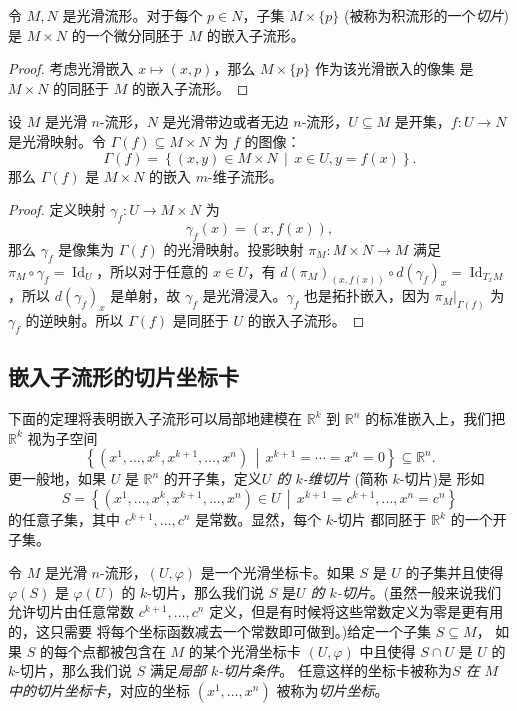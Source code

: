 \documentclass[fontset=none]{Notes}
\DeclareMathOperator\Id{Id}
\begin{document}
\begin{proposition}[积流形的切片]
  令 $M,N$ 是光滑流形。对于每个 $p\in N$，子集 $M\times\{p\}$ (被称为积流形的一个\emph{切片})
  是 $M\times N$ 的一个微分同胚于 $M$ 的嵌入子流形。
\end{proposition}
\begin{proof}
  考虑光滑嵌入 $x\mapsto (x,p)$，那么 $M\times\{p\}$ 作为该光滑嵌入的像集
  是 $M\times N$ 的同胚于 $M$ 的嵌入子流形。
\end{proof}

\begin{proposition}[图像作为子流形]\label{prop:graph is submanifold}
  设 $M$ 是光滑 $n$-流形，$N$ 是光滑带边或者无边 $n$-流形，$U\subseteq M$
  是开集，$f:U\to N$ 是光滑映射。令 $\Gamma(f)\subseteq M\times N$ 为 $f$
  的图像：
  \[
    \Gamma(f)=\left\{(x,y)\in M\times N\,\middle|\, x\in U,y=f(x)\right\}  .
  \]
  那么 $\Gamma(f)$ 是 $M\times N$ 的嵌入 $m$-维子流形。
\end{proposition}
\begin{proof}
  定义映射 $\gamma_f:U\to M\times N$ 为
  \[
    \gamma_f(x)=(x,f(x)),
  \]
  那么 $\gamma_f$ 是像集为 $\Gamma(f)$ 的光滑映射。投影映射 $\pi_M:M\times N\to M$
  满足 $\pi_M\circ\gamma_f=\Id_U$，所以对于任意的 $x\in U$，有 
  $d(\pi_M)_{(x,f(x))}\circ d(\gamma_f)_x=\Id_{T_xM}$，所以 $d(\gamma_f)_x$
  是单射，故 $\gamma_f$ 是光滑浸入。$\gamma_f$ 也是拓扑嵌入，因为
  $\pi_M|_{\Gamma(f)}$ 为 $\gamma_f$ 的逆映射。所以 $\Gamma(f)$
  是同胚于 $U$ 的嵌入子流形。
\end{proof}

\subsection{嵌入子流形的切片坐标卡}

下面的定理将表明嵌入子流形可以局部地建模在 $\mathbb{R}^k$ 到 $\mathbb{R}^n$
的标准嵌入上，我们把 $\mathbb{R}^k$ 视为子空间
\[
  \left\{\left(x^1,\dots,x^k,x^{k+1},\dots,x^n\right)\,\middle|\,x^{k+1}=\cdots=x^n=0\right\}  
  \subseteq\mathbb{R}^n.
\]
更一般地，如果 $U$ 是 $\mathbb{R}^n$ 的开子集，定义\emph{$U$ 的 $k$-维切片}
(简称 $k$-切片)是
形如
\[
  S=\left\{\left(x^1,\dots,x^k,x^{k+1},\dots,x^n\right)\in U\,\middle|\,
  x^{k+1}=c^{k+1},\dots,x^n=c^n\right\}  
\]
的任意子集，其中 $c^{k+1},\dots,c^n$ 是常数。显然，每个 $k$-切片
都同胚于 $\mathbb{R}^k$ 的一个开子集。

令 $M$ 是光滑 $n$-流形，$(U,\varphi)$ 是一个光滑坐标卡。如果 $S$
是 $U$ 的子集并且使得 $\varphi(S)$ 是 $\varphi(U)$ 的 $k$-切片，那么我们说
$S$ 是\emph{$U$ 的 $k$-切片}。(虽然一般来说我们允许切片由任意常数
$c^{k+1},\dots,c^n$ 定义，但是有时候将这些常数定义为零是更有用的，这只需要
将每个坐标函数减去一个常数即可做到。)给定一个子集 $S\subseteq M$，
如果 $S$ 的每个点都被包含在 $M$ 的某个光滑坐标卡 $(U,\varphi)$ 中且使得
$S\cap U$ 是 $U$ 的 $k$-切片，那么我们说 $S$ 满足\emph{局部 $k$-切片条件}。
任意这样的坐标卡被称为\emph{$S$ 在 $M$ 中的切片坐标卡}，对应的坐标 
$\left(x^1,\dots,x^n\right)$ 被称为\emph{切片坐标}。
\end{document}
